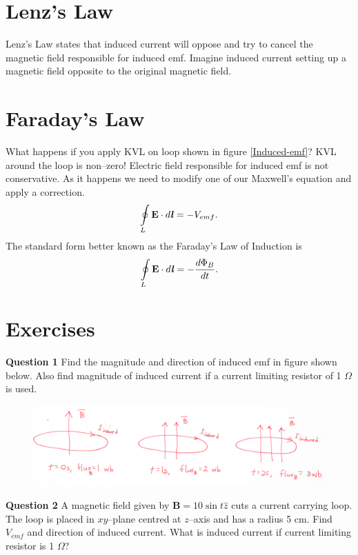 \documentclass[12pt,a4paper]{article}
\begin{document}
\section{Lenz's Law}
Lenz's Law states that induced current will oppose and try to cancel the magnetic field responsible for induced emf. Imagine induced current setting up a magnetic field opposite to the original magnetic field.
\section{Faraday's Law}
What happens if you apply KVL on loop shown in figure \ref{Induced-emf}? KVL around the loop is non--zero! Electric field responsible for induced emf is not conservative. As it happens we need to modify one of our Maxwell's equation and apply a correction.
\begin{equation}
\oint\limits_{L} \textbf{E}\cdot d\textbf{\textit{l}}=-V_{emf}.
\end{equation}
The standard form better known as the Faraday's Law of Induction is
\begin{equation}
\oint\limits_{L} \textbf{E}\cdot d\textbf{\textit{l}}=-\dfrac{d\Phi_B}{dt}.
\end{equation}
\newpage
\section{Exercises}
\noindent\textbf{Question 1} Find the magnitude and direction of induced emf in figure shown below. Also find magnitude of induced current if a current limiting resistor of 1 $\Omega$ is used.
\begin{figure}[H]
\centering
\includegraphics[width=\textwidth]{ChangingFlux.png}
\label{Changing-Flux}
\end{figure}
\noindent\textbf{Question 2} A magnetic field given by $\textbf{B}=10\sin t\hat z$ cuts a current carrying loop. The loop is placed in $xy$--plane centred at $z$--axis and has a radius 5 cm. Find $V_{emf}$ and direction of induced current. What is induced current if current limiting resistor is 1 $\Omega$?


\end{document}
